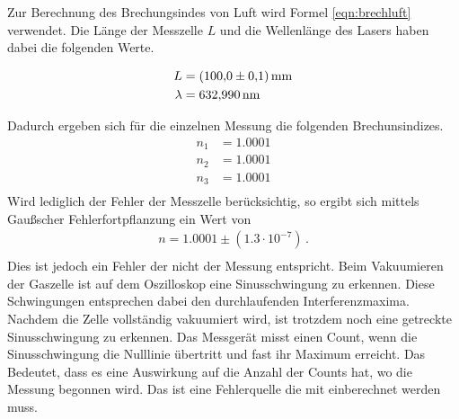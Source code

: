 Zur Berechnung des Brechungsindes von Luft wird Formel \ref{eqn:brechluft}
verwendet. Die Länge der Messzelle $L$ und die Wellenlänge des Lasers
haben dabei die folgenden Werte.

\begin{align*}
  L &= \SI{100 \pm 0.1}{\milli\meter} \\
  \lambda &= \SI{632.990}{\nano\meter} \\
\end{align*}

Dadurch ergeben sich für die einzelnen Messung die folgenden Brechunsindizes.
\begin{align*}
  n_1 &= 1.0001 \\
  n_2 &= 1.0001 \\
  n_3 &= 1.0001 \\
\end{align*}
Wird lediglich der Fehler der Messzelle berücksichtig, so ergibt sich mittels
Gaußscher Fehlerfortpflanzung ein Wert von
\begin{align*}
  n = 1.0001 \pm (1.3 \cdot 10^{-7}) \, .\\
\end{align*}
Dies ist jedoch ein Fehler der nicht der Messung entspricht. Beim Vakuumieren
der Gaszelle ist auf dem Oszilloskop eine Sinusschwingung zu erkennen. Diese
Schwingungen entsprechen dabei den durchlaufenden Interferenzmaxima. Nachdem
die Zelle vollständig vakuumiert wird, ist trotzdem noch eine getreckte
Sinusschwingung zu erkennen. Das Messgerät misst einen Count, wenn die
Sinusschwingung die Nulllinie übertritt und fast ihr Maximum erreicht. Das
Bedeutet, dass es eine Auswirkung auf die Anzahl der Counts hat, wo die
Messung begonnen wird. Das ist eine Fehlerquelle die mit einberechnet werden
muss.
